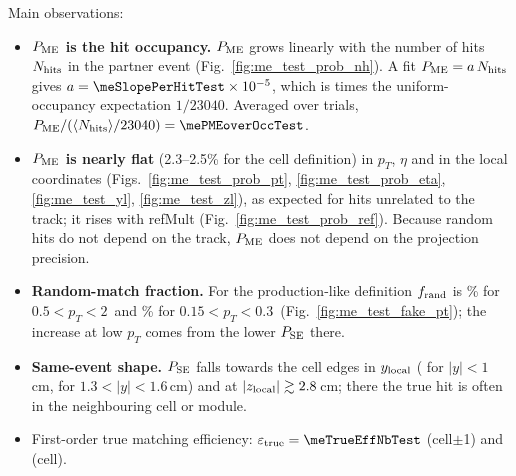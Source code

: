 Main observations:
\begin{itemize}
\item \textbf{$P_{\rm ME}$ is the hit occupancy.} $P_{\rm ME}$ grows linearly with the number of hits $N_{\rm hits}$ in the partner
  event (Fig.~\ref{fig:me_test_prob_nh}). A fit $P_{\rm ME}=a\,N_{\rm hits}$ gives $a=\meSlopePerHitTest\times10^{-5}$,
  which is \meSlopeRatioTest{} times the uniform-occupancy expectation $1/23040$. Averaged over trials,
  $P_{\rm ME}/(\langle N_{\rm hits}\rangle/23040)=\mePMEoverOccTest$.
\item \textbf{$P_{\rm ME}$ is nearly flat} (2.3--2.5\% for the cell definition) in $p_T$, $\eta$ and in the local coordinates
  (Figs.~\ref{fig:me_test_prob_pt}, \ref{fig:me_test_prob_eta}, \ref{fig:me_test_yl}, \ref{fig:me_test_zl}),
  as expected for hits unrelated to the track; it rises with refMult (Fig.~\ref{fig:me_test_prob_ref}).
  Because random hits do not depend on the track, $P_{\rm ME}$ does not depend on the projection precision.
\item \textbf{Random-match fraction.} For the production-like definition $f_{\rm rand}$ is \meFakeMidNbTest\% for
  $0.5<p_T<2$\,\GeVc{} and \meFakeLowNbTest\% for $0.15<p_T<0.3$\,\GeVc{} (Fig.~\ref{fig:me_test_fake_pt}); the
  increase at low $p_T$ comes from the lower $P_{\rm SE}$ there.
\item \textbf{Same-event shape.} $P_{\rm SE}$ falls towards the cell edges in $y_{\rm local}$
  (\mePSEylCoreTest{} for $|y|<1$\,cm, \mePSEylEdgeTest{} for $1.3<|y|<1.6$\,cm) and at $|z_{\rm local}|\gtrsim2.8$\,cm;
  there the true hit is often in the neighbouring cell or module.
\item First-order true matching efficiency: $\varepsilon_{\rm true}=\meTrueEffNbTest$ (cell$\pm$1) and
  \meTrueEffTest{} (cell).
\end{itemize}


